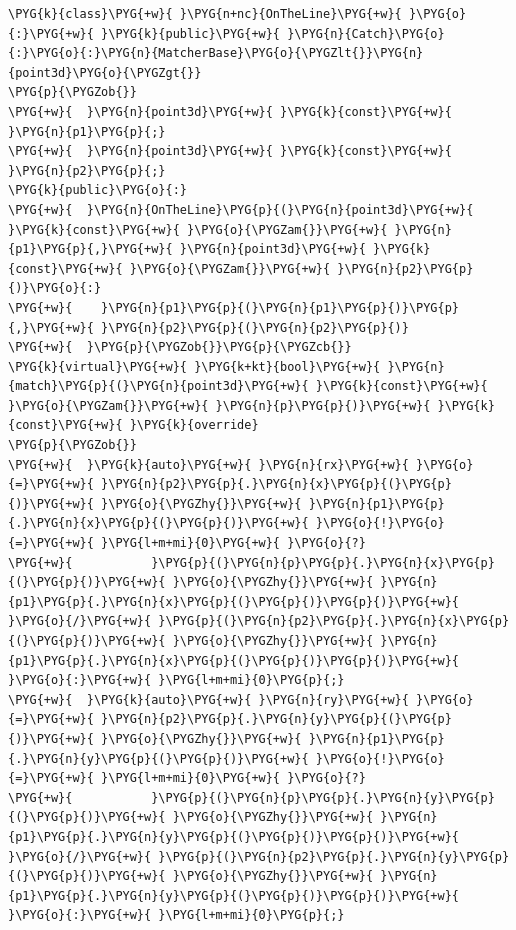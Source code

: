 \begin{codeblockbg}
\begin{Verbatim}[commandchars=\\\{\},breaklines=true,breakanywhere=true,fontsize=\codefont,xleftmargin=17bp]
\PYG{k}{class}\PYG{+w}{ }\PYG{n+nc}{OnTheLine}\PYG{+w}{ }\PYG{o}{:}\PYG{+w}{ }\PYG{k}{public}\PYG{+w}{ }\PYG{n}{Catch}\PYG{o}{:}\PYG{o}{:}\PYG{n}{MatcherBase}\PYG{o}{\PYGZlt{}}\PYG{n}{point3d}\PYG{o}{\PYGZgt{}}
\PYG{p}{\PYGZob{}}
\PYG{+w}{  }\PYG{n}{point3d}\PYG{+w}{ }\PYG{k}{const}\PYG{+w}{ }\PYG{n}{p1}\PYG{p}{;}
\PYG{+w}{  }\PYG{n}{point3d}\PYG{+w}{ }\PYG{k}{const}\PYG{+w}{ }\PYG{n}{p2}\PYG{p}{;}
\PYG{k}{public}\PYG{o}{:}
\PYG{+w}{  }\PYG{n}{OnTheLine}\PYG{p}{(}\PYG{n}{point3d}\PYG{+w}{ }\PYG{k}{const}\PYG{+w}{ }\PYG{o}{\PYGZam{}}\PYG{+w}{ }\PYG{n}{p1}\PYG{p}{,}\PYG{+w}{ }\PYG{n}{point3d}\PYG{+w}{ }\PYG{k}{const}\PYG{+w}{ }\PYG{o}{\PYGZam{}}\PYG{+w}{ }\PYG{n}{p2}\PYG{p}{)}\PYG{o}{:}
\PYG{+w}{    }\PYG{n}{p1}\PYG{p}{(}\PYG{n}{p1}\PYG{p}{)}\PYG{p}{,}\PYG{+w}{ }\PYG{n}{p2}\PYG{p}{(}\PYG{n}{p2}\PYG{p}{)}
\PYG{+w}{  }\PYG{p}{\PYGZob{}}\PYG{p}{\PYGZcb{}}
\PYG{k}{virtual}\PYG{+w}{ }\PYG{k+kt}{bool}\PYG{+w}{ }\PYG{n}{match}\PYG{p}{(}\PYG{n}{point3d}\PYG{+w}{ }\PYG{k}{const}\PYG{+w}{ }\PYG{o}{\PYGZam{}}\PYG{+w}{ }\PYG{n}{p}\PYG{p}{)}\PYG{+w}{ }\PYG{k}{const}\PYG{+w}{ }\PYG{k}{override}
\PYG{p}{\PYGZob{}}
\PYG{+w}{  }\PYG{k}{auto}\PYG{+w}{ }\PYG{n}{rx}\PYG{+w}{ }\PYG{o}{=}\PYG{+w}{ }\PYG{n}{p2}\PYG{p}{.}\PYG{n}{x}\PYG{p}{(}\PYG{p}{)}\PYG{+w}{ }\PYG{o}{\PYGZhy{}}\PYG{+w}{ }\PYG{n}{p1}\PYG{p}{.}\PYG{n}{x}\PYG{p}{(}\PYG{p}{)}\PYG{+w}{ }\PYG{o}{!}\PYG{o}{=}\PYG{+w}{ }\PYG{l+m+mi}{0}\PYG{+w}{ }\PYG{o}{?}
\PYG{+w}{           }\PYG{p}{(}\PYG{n}{p}\PYG{p}{.}\PYG{n}{x}\PYG{p}{(}\PYG{p}{)}\PYG{+w}{ }\PYG{o}{\PYGZhy{}}\PYG{+w}{ }\PYG{n}{p1}\PYG{p}{.}\PYG{n}{x}\PYG{p}{(}\PYG{p}{)}\PYG{p}{)}\PYG{+w}{ }\PYG{o}{/}\PYG{+w}{ }\PYG{p}{(}\PYG{n}{p2}\PYG{p}{.}\PYG{n}{x}\PYG{p}{(}\PYG{p}{)}\PYG{+w}{ }\PYG{o}{\PYGZhy{}}\PYG{+w}{ }\PYG{n}{p1}\PYG{p}{.}\PYG{n}{x}\PYG{p}{(}\PYG{p}{)}\PYG{p}{)}\PYG{+w}{ }\PYG{o}{:}\PYG{+w}{ }\PYG{l+m+mi}{0}\PYG{p}{;}
\PYG{+w}{  }\PYG{k}{auto}\PYG{+w}{ }\PYG{n}{ry}\PYG{+w}{ }\PYG{o}{=}\PYG{+w}{ }\PYG{n}{p2}\PYG{p}{.}\PYG{n}{y}\PYG{p}{(}\PYG{p}{)}\PYG{+w}{ }\PYG{o}{\PYGZhy{}}\PYG{+w}{ }\PYG{n}{p1}\PYG{p}{.}\PYG{n}{y}\PYG{p}{(}\PYG{p}{)}\PYG{+w}{ }\PYG{o}{!}\PYG{o}{=}\PYG{+w}{ }\PYG{l+m+mi}{0}\PYG{+w}{ }\PYG{o}{?}
\PYG{+w}{           }\PYG{p}{(}\PYG{n}{p}\PYG{p}{.}\PYG{n}{y}\PYG{p}{(}\PYG{p}{)}\PYG{+w}{ }\PYG{o}{\PYGZhy{}}\PYG{+w}{ }\PYG{n}{p1}\PYG{p}{.}\PYG{n}{y}\PYG{p}{(}\PYG{p}{)}\PYG{p}{)}\PYG{+w}{ }\PYG{o}{/}\PYG{+w}{ }\PYG{p}{(}\PYG{n}{p2}\PYG{p}{.}\PYG{n}{y}\PYG{p}{(}\PYG{p}{)}\PYG{+w}{ }\PYG{o}{\PYGZhy{}}\PYG{+w}{ }\PYG{n}{p1}\PYG{p}{.}\PYG{n}{y}\PYG{p}{(}\PYG{p}{)}\PYG{p}{)}\PYG{+w}{ }\PYG{o}{:}\PYG{+w}{ }\PYG{l+m+mi}{0}\PYG{p}{;}

\end{Verbatim}
\end{codeblockbg}
